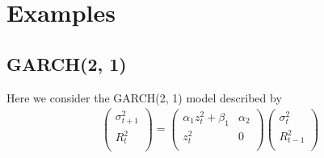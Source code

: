 \documentclass{article}
\theoremstyle{remark}
\begin{document}
\section{Examples}
\subsection{GARCH(2, 1)}
Here we consider the GARCH(2, 1) model described by
\begin{eqnarray*}
  \begin{pmatrix}
    \sigma_{t+1}^2 \\
    R_t^2 \\
  \end{pmatrix}
  =
  \begin{pmatrix}
    \alpha_1 z_t^2 + \beta_1 & \alpha_2 \\
    z_t^2 & 0 \\
  \end{pmatrix}
  \begin{pmatrix}
    \sigma_t^2 \\
    R_{t-1}^2 \\
  \end{pmatrix}
\end{eqnarray*}
\end{document}
